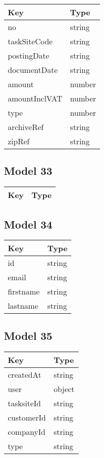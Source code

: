 \documentclass[10pt]{article}
\begin{document}
            \begin{tabularx}{\textwidth}{lZ}
                \textbf{Key} & \textbf{Type} \\
                \hline
                    no & string \\
                    taskSiteCode & string \\
                    postingDate & string \\
                    documentDate & string \\
                    amount & number \\
                    amountInclVAT & number \\
                    type & number \\
                    archiveRef & string \\
                    zipRef & string \\
            \end{tabularx}
            \subsection{Model 33}
            
            \begin{tabularx}{\textwidth}{lZ}
                \textbf{Key} & \textbf{Type} \\
                \hline
            \end{tabularx}
            \subsection{Model 34}
            
            \begin{tabularx}{\textwidth}{lZ}
                \textbf{Key} & \textbf{Type} \\
                \hline
                    id & string \\
                    email & string \\
                    firstname & string \\
                    lastname & string \\
            \end{tabularx}
            \subsection{Model 35}
            
            \begin{tabularx}{\textwidth}{lZ}
                \textbf{Key} & \textbf{Type} \\
                \hline
                    createdAt & string \\
                    user & object \\
                    tasksiteId & string \\
                    customerId & string \\
                    companyId & string \\
                    type & string \\
            \end{tabularx}
\end{document}
